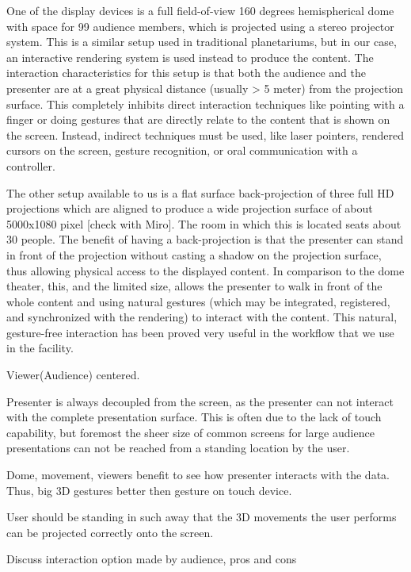 \documentclass[review,journal]{vgtc}         %
\begin{document}
One of the display devices is a full field-of-view 160 degrees hemispherical dome with space for 99 audience members, which is projected using a stereo projector system.
This is a similar setup used in traditional planetariums, but in our case, an interactive rendering system is used instead to produce the content.
The interaction characteristics for this setup is that both the audience and the presenter are at a great physical distance (usually > 5 meter) from the projection surface.
This completely inhibits direct interaction techniques like pointing with a finger or doing gestures that are directly relate to the content that is shown on the screen.
Instead, indirect techniques must be used, like laser pointers, rendered cursors on the screen, gesture recognition, or oral communication with a controller.

The other setup available to us is a flat surface back-projection of three full HD projections which are aligned to produce a wide projection surface of about 5000x1080 pixel [check with Miro].
The room in which this is located seats about 30 people.
The benefit of having a back-projection is that the presenter can stand in front of the projection without casting a shadow on the projection surface, thus allowing physical access to the displayed content.
In comparison to the dome theater, this, and the limited size, allows the presenter to walk in front of the whole content and using natural gestures (which may be integrated, registered, and synchronized with the rendering) to interact with the content.
This natural, gesture-free interaction has been proved very useful in the workflow that we use in the facility.


Viewer(Audience) centered.

Presenter is always decoupled from the screen, as the presenter can not interact with the complete presentation surface. This is often due to the lack of touch capability, but foremost the sheer size of common screens for large audience presentations can not be reached from a standing location by the user.

Dome, movement, viewers benefit to see how presenter interacts with the data.
Thus, big 3D gestures better then gesture on touch device.

User should be standing in such away that the 3D movements the user performs can be projected correctly onto the screen.

Discuss interaction option made by audience, pros and cons
\end{document}
